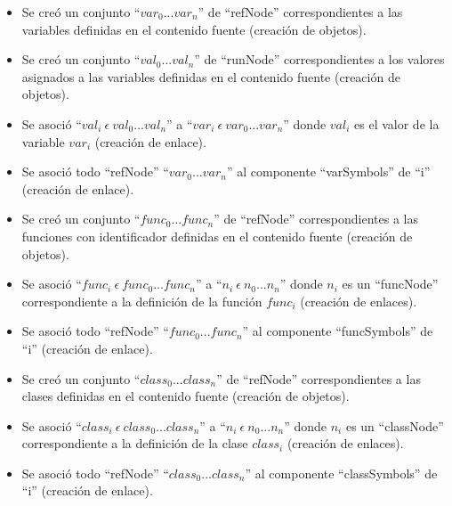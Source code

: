 \begin{framed}
\begin{description}
\begin {itemize}
         \item Se creó un conjunto ``$var_0...var_n$'' de ``refNode'' correspondientes a las variables definidas en el contenido fuente (creación de objetos).
         \item Se creó un conjunto ``$val_0...val_n$'' de ``runNode'' correspondientes a los valores asignados a las variables definidas en el contenido fuente (creación de objetos).
         \item Se asoció ``$val_i\ \epsilon\ val_0...val_n$'' a  ``$var_i\ \epsilon\ var_0...var_n$'' donde $val_i$ es el valor de la variable $var_i$ (creación de enlace). 
         \item Se asoció todo ``refNode'' ``$var_0...var_n$'' al componente ``varSymbols'' de ``i'' (creación de enlace). 
         \item Se creó un conjunto ``$func_0...func_n$'' de ``refNode'' correspondientes a las funciones con identificador definidas en el contenido fuente (creación de objetos).
         \item Se asoció ``$func_i\ \epsilon\ func_0...func_n$'' a  ``$n_i\ \epsilon\ n_0...n_n$'' donde $n_i$ es un ``funcNode'' correspondiente a la definición de la función $func_i$ (creación de enlaces).
         \item Se asoció todo ``refNode'' ``$func_0...func_n$'' al componente ``funcSymbols'' de ``i'' (creación de enlace). 
         \item Se creó un conjunto ``$class_0...class_n$'' de ``refNode'' correspondientes a las clases definidas en el contenido fuente (creación de objetos).
         \item Se asoció ``$class_i\ \epsilon\ class_0...class_n$'' a  ``$n_i\ \epsilon\ n_0...n_n$'' donde $n_i$ es un ``classNode'' correspondiente a la definición de la clase $class_i$ (creación de enlaces).
         \item Se asoció todo ``refNode'' ``$class_0...class_n$'' al componente ``classSymbols'' de ``i'' (creación de enlace). 
      \end{itemize}
	\end{description}
\end{framed}
\FloatBarrier

